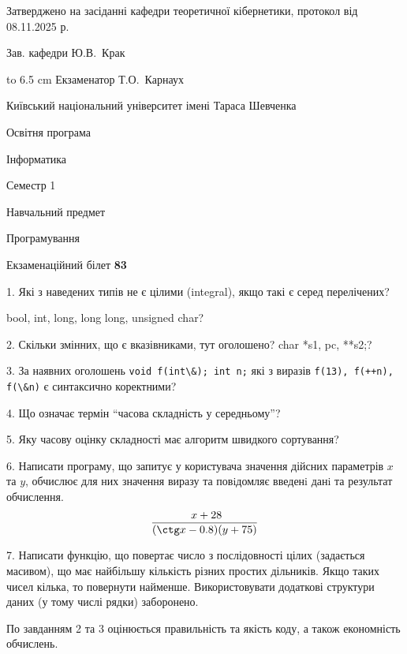 \documentclass[12pt, ukrainian]{article}
\def\code#1{\Verb!#1!}
\begin{document}
{\smallskip\smallskip \begin {scriptsize} Затверджено на засіданні кафедри теоретичної кібернетики, протокол   від   08.11.2025 р.\par\smallskip\smallskip\smallskip\smallskip
{\parbox {6.5 cm} {Зав. кафедри \dotfill Ю.В.~Крак}}\hspace {0.7cm} {\hbox to 6.5 cm { Екзаменатор \dotfill Т.О.~Карнаух}} \end{scriptsize}}
\newpage
{{\begin {scriptsize}\par
{ \center  Київський національний університет імені Тараса Шевченка \par}
{\parbox {5 cm}{Освітня програма \hfill}{\parbox {7 cm}{Інформатика\hfill}}\parbox {6 cm}{\hfill Семестр 1}}\par
{\parbox {5 cm} {Навчальний предмет \hfill}\parbox {7 cm}{Програмування \hfill}\parbox {6cm}{\hfill}\par}\vspace{-15pt} \end{scriptsize}}{\center Екзаменаційний білет \No \textbf { 83 }\par}}
{%
1. Які з наведених типів не є цілими (integral), якщо такі є серед перелічених?

bool, int, long, long long, unsigned char?
\par
\vspace{2mm}
2. Скільки змінних, що є вказівниками, тут оголошено?
char *s1, pc, **s2;?
\par
\vspace{2mm}
3. За наявних оголошень \code{void f(int\&); int n;} які з виразів \code{f(13), f(++n), f(\&n)} є синтаксично коректними?
\par
\vspace{2mm}
4. Що означає термін ``часова складність у середньому''?
\par
\vspace{2mm}
5. Яку часову оцінку складності має алгоритм швидкого сортування?
\par
\vspace{2mm}
6. Написати програму, що запитує у користувача значення дійсних параметрів $x$ та $y$, обчислює для них значення виразу та повiдомляє введенi данi та результат обчислення.
$$\frac{\ x + 28}{(\ctg x - 0.8) (y + 75)}$$ 

\par
7. Написати функцію, що повертає число з послідовності цілих (задається масивом), що має найбільшу кількість різних простих дільників. Якщо таких чисел кілька, то повернути найменше. Використовувати додаткові структури даних (у тому числі рядки) заборонено.

По завданням 2 та 3 оцінюється правильність та якість коду, а також економність обчислень.

}
\end{document}
